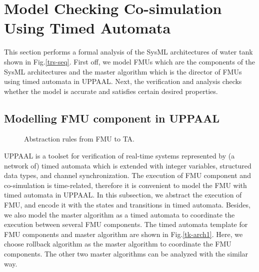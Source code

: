 \section{Model Checking Co-simulation Using Timed Automata}
\label{sec:ma&uppaal}
This section performs a formal analysis of the SysML architectures of water tank shown in Fig.\ref{trs-seq}. First off, we model FMUs which are the components of the SysML architectures and the master algorithm which is the director of FMUs using timed automata in UPPAAL. Next, the verification and analysis checks whether the model is accurate and satisfies certain desired properties. 

\subsection{Modelling FMU component in UPPAAL}
\begin{figure}[htbp]
	\begin{center}
	\caption{Abstraction rules from FMU to TA.}
	\end{center}\label{paperarc}
\end{figure}

UPPAAL \cite{BehrmannDLHPYH06} is a toolset for verification of real-time systems represented by (a network of) timed automata which is extended with integer variables, structured data types, and channel synchronization. The execution of FMU component and co-simulation is time-related, therefore it is convenient to model the FMU with timed automata in UPPAAL. In this subsection, we abstract the execution of FMU, and encode it with the states and transitions in timed automata. Besides, we also model the master algorithm as a timed automata to coordinate the execution between several FMU components. The timed automata template for FMU components and master algorithm are shown in Fig.\ref{tk-arch1}. Here, we choose rollback algorithm as the master algorithm to coordinate the FMU components. The other two master algorithms can be analyzed with the similar way.

